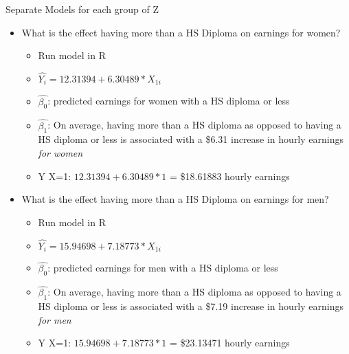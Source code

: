 \documentclass[8pt,ignorenonframetext,dvipsnames]{beamer}
\providecommand{\tightlist}{%
  \setlength{\itemsep}{0pt}\setlength{\parskip}{0pt}}
\let\olditem\item
\renewcommand{\item}{%
  \olditem\vspace{4pt}
}
\begin{document}
\begin{frame}{Separate Models for each group of Z}
\protect\hypertarget{separate-models-for-each-group-of-z}{}

\begin{itemize}
\tightlist
\item
  What is the effect having more than a HS Diploma on earnings for
  women?

  \begin{itemize}
  \tightlist
  \item
    Run model in R
  \item
    \(\hat{Y_i} = 12.31394 + 6.30489*X_{1i}\)
  \item
    \(\hat{\beta_0}\): predicted earnings for women with a HS diploma or
    less
  \item
    \(\hat{\beta_1}\): On average, having more than a HS diploma as
    opposed to having a HS diploma or less is associated with a \$6.31
    increase in hourly earnings \emph{for women}
  \item
    Y\textbar{} X=1: \(12.31394 + 6.30489*1\) = \$18.61883 hourly
    earnings
  \end{itemize}
\item
  What is the effect having more than a HS Diploma on earnings for men?

  \begin{itemize}
  \tightlist
  \item
    Run model in R
  \item
    \(\hat{Y_i} = 15.94698 + 7.18773*X_{1i}\)
  \item
    \(\hat{\beta_0}\): predicted earnings for men with a HS diploma or
    less
  \item
    \(\hat{\beta_1}\): On average, having more than a HS diploma as
    opposed to having a HS diploma or less is associated with a \$7.19
    increase in hourly earnings \emph{for men}
  \item
    Y\textbar{} X=1: \(15.94698 + 7.18773*1\) = \$23.13471 hourly
    earnings
  \end{itemize}
\end{itemize}

\end{frame}
\end{document}
